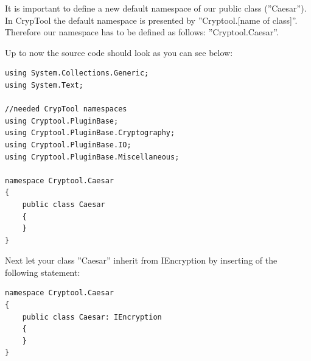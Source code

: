 It is important to define a new default namespace of our public class (''Caesar''). In CrypTool the default namespace is presented by ''Cryptool.[name of class]''. Therefore our namespace has to be defined as follows: ''Cryptool.Caesar''.\clearpage

Up to now the source code should look as you can see below:

\begin{lstlisting}
using System.Collections.Generic;
using System.Text;

//needed CrypTool namespaces
using Cryptool.PluginBase;
using Cryptool.PluginBase.Cryptography;
using Cryptool.PluginBase.IO;
using Cryptool.PluginBase.Miscellaneous;

namespace Cryptool.Caesar
{
	public class Caesar
	{
	}
}
\end{lstlisting}
Next let your class ''Caesar'' inherit from IEncryption by inserting of the following statement:
\begin{lstlisting}
namespace Cryptool.Caesar
{
	public class Caesar: IEncryption
	{
	}
}
\end{lstlisting}

